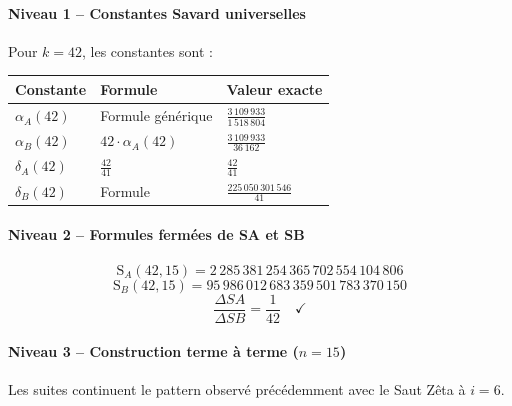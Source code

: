 \documentclass[11pt,a4paper]{article}
\newcommand{\SA}{\mathrm{S}_A}
\newcommand{\SB}{\mathrm{S}_B}
\begin{document}
\vspace{0.3cm}

\paragraph{Niveau 1 -- Constantes Savard universelles}

Pour $k=42$, les constantes sont :
\begin{center}
\small
\begin{tabular}{@{}lll@{}}
\toprule
\rowcolor{spectralgris}
\textbf{Constante} & \textbf{Formule} & \textbf{Valeur exacte} \\
\midrule
$\alpha_A(42)$ & Formule générique & $\frac{3\,109\,933}{1\,518\,804}$ \\
$\alpha_B(42)$ & $42 \cdot \alpha_A(42)$ & $\frac{3\,109\,933}{36\,162}$ \\
$\delta_A(42)$ & $\frac{42}{41}$ & $\frac{42}{41}$ \\
$\delta_B(42)$ & Formule & $\frac{225\,050\,301\,546}{41}$ \\
\bottomrule
\end{tabular}
\end{center}

\vspace{0.3cm}

\paragraph{Niveau 2 -- Formules fermées de SA et SB}

$$\SA(42, 15) = 2\,285\,381\,254\,365\,702\,554\,104\,806$$
$$\SB(42, 15) = 95\,986\,012\,683\,359\,501\,783\,370\,150$$
$$\frac{\Delta SA}{\Delta SB} = \frac{1}{42} \quad \checkmark$$

\vspace{0.3cm}

\paragraph{Niveau 3 -- Construction terme à terme ($n = 15$)}

Les suites continuent le pattern observé précédemment avec le Saut Zêta à $i=6$.
\end{document}
